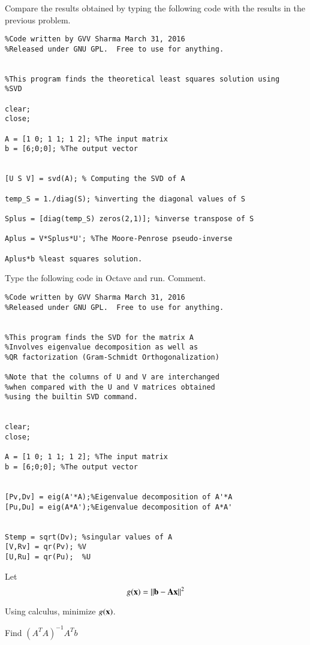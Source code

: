 %
\begin{problem}
	Compare the results obtained by typing the following code with the results in the previous problem.
\begin{verbatim}
%Code written by GVV Sharma March 31, 2016
%Released under GNU GPL.  Free to use for anything.


%This program finds the theoretical least squares solution using 
%SVD 

clear;
close;

A = [1 0; 1 1; 1 2]; %The input matrix
b = [6;0;0]; %The output vector


[U S V] = svd(A); % Computing the SVD of A

temp_S = 1./diag(S); %inverting the diagonal values of S

Splus = [diag(temp_S) zeros(2,1)]; %inverse transpose of S

Aplus = V*Splus*U'; %The Moore-Penrose pseudo-inverse

Aplus*b %least squares solution.

\end{verbatim}
\end{problem}
%
\begin{problem}
	Type the following code in Octave and run.  Comment.
\begin{verbatim}
%Code written by GVV Sharma March 31, 2016
%Released under GNU GPL.  Free to use for anything.


%This program finds the SVD for the matrix A
%Involves eigenvalue decomposition as well as 
%QR factorization (Gram-Schmidt Orthogonalization)

%Note that the columns of U and V are interchanged
%when compared with the U and V matrices obtained 
%using the builtin SVD command.


clear;
close;

A = [1 0; 1 1; 1 2]; %The input matrix
b = [6;0;0]; %The output vector


[Pv,Dv] = eig(A'*A);%Eigenvalue decomposition of A'*A
[Pu,Du] = eig(A*A');%Eigenvalue decomposition of A*A'


Stemp = sqrt(Dv); %singular values of A 
[V,Rv] = qr(Pv); %V
[U,Ru] = qr(Pu);  %U

\end{verbatim}
\end{problem}
%
	Let 
	\begin{equation}
	g(\mathbf{x}) = \lVert\mathbf{b} -\mathbf{Ax}\rVert^2
	\end{equation}
	
%
\begin{problem}
		Using calculus, minimize $g(\mathbf{x})$.
\end{problem}
%
\begin{problem}
Find $(A^TA)^{-1}A^Tb$
\end{problem}

